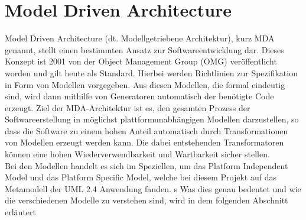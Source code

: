 \section{Model Driven Architecture} \label{MDA}
Model Driven Architecture (dt. Modellgetriebene Architektur), kurz MDA genannt, stellt
einen bestimmten Ansatz zur Softwareentwicklung dar. Dieses Konzept ist 2001 von der
Object Management Group (OMG) veröffentlicht worden und gilt heute als
Standard. Hierbei werden Richtlinien zur Spezifikation in Form von Modellen vorgegeben.
Aus diesen Modellen, die formal eindeutig sind, wird dann mithilfe von Generatoren
automatisch der benötigte Code erzeugt. Ziel der MDA-Architektur ist es, den gesamten Prozess der Softwareerstellung in möglichst plattformunabhängigen Modellen darzustellen, so dass die Software zu einem hohen Anteil automatisch durch Transformationen von Modellen erzeugt werden kann. Die dabei entstehenden Transformatoren können eine hohen Wiederverwendbarkeit und Wartbarkeit sicher stellen.\cite[S. 79 f.]{bib:MDA1}\\
Bei den Modellen handelt es sich im Speziellen, um das Platform Independent Model und das Platform Specific Model, welche bei diesem Projekt auf das Metamodell der UML 2.4 Anwendung fanden. s
Was dies genau bedeutet und wie die verschiedenen Modelle zu verstehen sind, wird in dem folgenden Abschnitt erläutert
